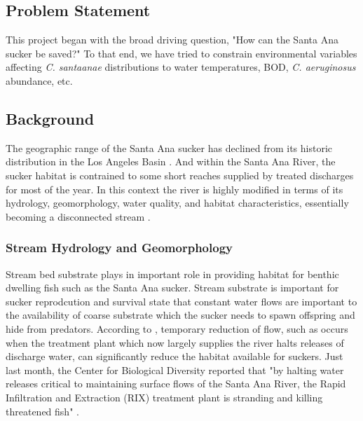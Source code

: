 \documentclass{article}\usepackage[]{graphicx}\usepackage[]{color}
\begin{document}
\subsection{Problem Statement}

This project began with the broad driving question, "How can the Santa Ana sucker be saved?" To that end, we have tried to constrain environmental variables affecting \emph{C. santaanae} distributions to water temperatures, BOD, \emph{C. aeruginosus} abundance, etc. 

\subsection{Background}

The geographic range of the Santa Ana sucker has declined from its historic distribution in the Los Angeles Basin \citep{brown2005aquatic, saiki2007life}. And within the Santa Ana River, the sucker habitat is contrained to some short reaches supplied by treated discharges for most of the year. In this context the river is highly modified in terms of its hydrology, geomorphology, water quality, and habitat characteristics, essentially becoming a disconnected stream \citep{poole2002fluvial}. 

\subsubsection{Stream Hydrology and Geomorphology}

Stream bed substrate plays in important role in providing habitat for benthic dwelling fish such as the Santa Ana sucker. Stream substrate is important for sucker reprodcution and survival \citet{saiki2007life, baskerville2012recovery} state that constant water flows are important to the availability of coarse substrate which the sucker needs to spawn offspring and hide from predators. According to \citet{evans2005long}, temporary reduction of flow, such as occurs when the treatment plant which now largely supplies the river halts releases of discharge water, can significantly reduce the habitat available for suckers. Just last month, the Center for Biological Diversity reported that "by halting water releases critical to maintaining surface flows of the Santa Ana River, the Rapid Infiltration and Extraction (RIX) treatment plant is stranding and killing threatened fish" \citep{evans2005draft}. 
\end{document}
